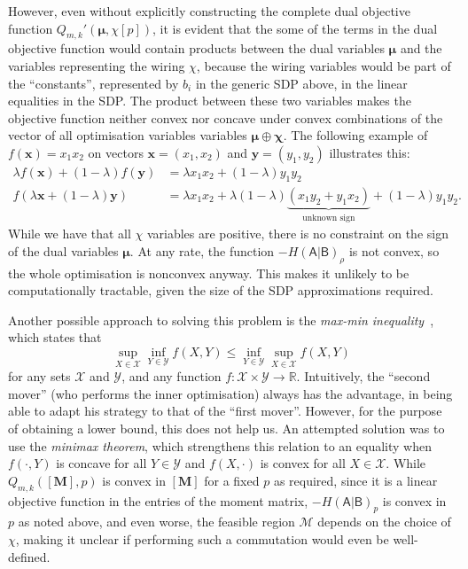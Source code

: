 \documentclass[10pt, a4paper]{article}
\numberwithin{equation}{section} %
\theoremstyle{definition}
\theoremstyle{plain}
\newcommand{\?}{\mathrel{?}} %
\newcommand{\R}{\mathbb{R}} %
\newcommand{\cvec}[1]{\boldsymbol{\mathbf{#1}}}    %
\newcommand{\matr}[2][]{\left[\mathbf{#2}#1\right]} %
\newcommand{\sM}{\mathcal{M}}
\newcommand{\sX}{\mathcal{X}}
\newcommand{\sY}{\mathcal{Y}}
\newcommand{\crv}[1]{\mathsf{#1}}
\begin{document}
                    However, even without explicitly constructing the complete dual objective function \(Q_{m,k}'(\cvec{\mu},\chi[p])\), it is evident that the some of the terms in the dual objective function would contain products between the dual variables \(\cvec{\mu}\) and the variables representing the wiring \(\chi\), because the wiring variables would be part of the ``constants'', represented by \(b_i\) in the generic SDP above, in the linear equalities in the SDP\@. The product between these two variables makes the objective function neither convex nor concave under convex combinations of the vector of all optimisation variables variables \(\cvec{\mu} \oplus \cvec{\chi}\). The following example of \(f(\cvec{x}) = x_1x_2\) on vectors \(\cvec{x} = (x_1, x_2)\) and \(\cvec{y} = (y_1, y_2)\) illustrates this:
                    \begin{align}
                      \lambda f(\cvec{x}) + (1-\lambda)f(\cvec{y}) &= \lambda{x_1x_2} + (1-\lambda){y_1y_2} \\
                      f(\lambda\cvec{x} + (1-\lambda)\cvec{y}) &= \lambda{x_1x_2} + \lambda(1-\lambda)\underbrace{(x_1y_2 + y_1x_2)}_{\text{unknown sign}} + (1-\lambda){y_1y_2}.
                    \end{align}
                  While we have that all \(\chi\) variables are positive, there is no constraint on the sign of the dual variables \(\cvec{\mu}\). At any rate, the function \(-H{(\crv{A}|\crv{B})}_{\rho}\) is not convex, so the whole optimisation is nonconvex anyway. This makes it unlikely to be computationally tractable, given the size of the SDP approximations required.

                  Another possible approach to solving this problem is the \emph{max-min inequality}~\cite[Sec. 5.4]{BoydVand}, which states that 
                  \begin{equation}
                    \sup_{X\in\sX} \inf_{Y\in\sY} f(X,Y) \leq \inf_{Y\in\sY} \sup_{X\in\sX} f(X,Y)
                  \end{equation}
                  for any sets \(\sX\) and \(\sY\), and any function \(f : \sX\times\sY \to \R\). Intuitively, the ``second mover'' (who performs the inner optimisation) always has the advantage, in being able to adapt his strategy to that of the ``first mover''. However, for the purpose of obtaining a lower bound, this does not help us. An attempted solution was to use the \emph{minimax theorem}, which strengthens this relation to an equality when \(f(\cdot,Y)\) is concave for all \(Y\in\sY\) and \(f(X,\cdot)\) is convex for all \(X\in\sX\). While \(Q_{m,k}(\matr{M}, p)\) is convex in \(\matr{M}\) for a fixed \(p\) as required, since it is a linear objective function in the entries of the moment matrix, \(-H{(\crv{A}|\crv{B})}_p\) is convex in \(p\) as noted above, and even worse, the feasible region \(\sM\) depends on the choice of \(\chi\), making it unclear if performing such a commutation would even be well-defined.
\end{document}
